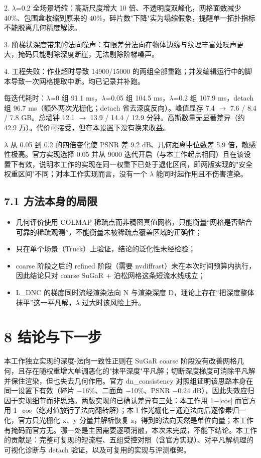 \documentclass[UTF8,a4paper,11pt]{ctexart}
\begin{document}
2. $\lambda$=0.2 全场景坍缩：高斯尺度增大 10 倍、不透明度双峰化，网格面数减少 40\%、包围盒收缩到原来的 40\%，碎片数"下降"实为塌缩假象，提醒单一拓扑指标不能脱离几何精度解读。

3. 阶梯状深度带来的法向噪声：有限差分法向在物体边缘与纹理丰富处噪声更大，掩码只能剔除深度断崖，无法剔除阶梯噪声。

4. 工程失败：作业超时导致 14900/15000 的两组全部重跑；并发编辑运行中的脚本导致一次网格提取中断。均已记录并补跑。

每迭代耗时：$\lambda$=0 组 91.1 ms，$\lambda$=0.05 组 104.5 ms，$\lambda$=0.2 组 107.9 ms，detach 组 96.7 ms（额外两次光栅化；detach 省去深度反向）。峰值显存 7.4 $\rightarrow$ 7.6 / 8.4 / 7.8 GB。总墙钟 12.1 $\rightarrow$ 13.9 / 14.4 / 12.9 分钟。高斯数量无显著差异（约 42.9 万）。代价可接受，但在本设置下没有换来收益。

$\lambda$ 从 0.05 到 0.2 的四倍变化使 PSNR 差 9.2 dB、几何距离中位数差 5.9 倍，敏感性极高。官方实现选择 0.05 并从 9000 迭代开启（与本工作起点相同）且在该设置下有效，说明本工作的实现在同一权重下已处于退化区间，即两版实现的"安全权重区间"不同；对本工作实现而言，没有一个 $\lambda$ 能同时起作用且不伤害渲染。

\subsection{7.1 方法本身的局限}
\begin{itemize}
\setlength{\itemsep}{2pt}
  \item 几何评价使用 COLMAP 稀疏点而非稠密真值网格，只能衡量“网格是否贴合可靠的稀疏观测”，不能衡量未被稀疏点覆盖区域的正确性；
  \item 只在单个场景（Truck）上验证，结论的泛化性未经检验；
  \item coarse 阶段之后的 refined 阶段（需要 nvdiffrast）未在本次时间预算内执行，因此结论只对 coarse SuGaR + 泊松网格这条短流水线成立；
  \item L\_DNC 的梯度同时流经渲染法向 N 与渲染深度 D，理论上存在“把深度整体抹平”这一平凡解，$\lambda$ 过大时该风险上升。
\end{itemize}
\section{8 结论与下一步}
本工作独立实现的深度-法向一致性正则在 SuGaR coarse 阶段没有改善网格几何，且存在随权重增大单调恶化的"抹平深度"平凡解；切断深度梯度可消除平凡解并保住渲染，但也失去几何作用。官方 dn\_consistency 对照组证明该思路本身在同一设置下有效（碎片 $-$16\%、二面角 $-$10\%、PSNR $-$0.24 dB），因此失效应归因于实现细节而非思路。两版实现的已确认差异有三处：本工作用 1$-$|cos| 而官方用 1$-$cos（绝对值放行了法向翻转解）；本工作光栅化三通道法向后逐像素归一化，官方只光栅化 x、y 分量并解析恢复 z，得到的法向天然是单位向量；本工作有掩码而官方无。哪一处是主因需要逐项消融，本次未完成，不能下结论。本工作的贡献是：完整可复现的短流程、五组受控对照（含官方实现）、对平凡解机理的可视化诊断与 detach 验证，以及可复用的实现与评测框架。
\end{document}
